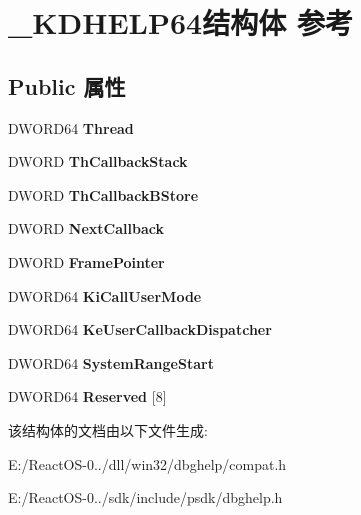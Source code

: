\hypertarget{struct___k_d_h_e_l_p64}{}\section{\+\_\+\+K\+D\+H\+E\+L\+P64结构体 参考}
\label{struct___k_d_h_e_l_p64}
\subsection*{Public 属性}
\begin{DoxyCompactItemize}
\item 
\mbox{\label{struct___k_d_h_e_l_p64_ad54883742842530e7313e9232ab58693}} 
D\+W\+O\+R\+D64 {\bfseries Thread}
\item 
\mbox{\label{struct___k_d_h_e_l_p64_a2960c0312baa12750404454f5a550930}} 
D\+W\+O\+RD {\bfseries Th\+Callback\+Stack}
\item 
\mbox{\label{struct___k_d_h_e_l_p64_a2627f807de1ce437da69006f3f827e11}} 
D\+W\+O\+RD {\bfseries Th\+Callback\+B\+Store}
\item 
\mbox{\label{struct___k_d_h_e_l_p64_a9bcc8fa46446b19a8aa5a03d6085baa9}} 
D\+W\+O\+RD {\bfseries Next\+Callback}
\item 
\mbox{\label{struct___k_d_h_e_l_p64_a9788c04d5d3fb25ba8b38542fd2f667b}} 
D\+W\+O\+RD {\bfseries Frame\+Pointer}
\item 
\mbox{\label{struct___k_d_h_e_l_p64_a7844c9d3f429c7b4c292083ae27a8beb}} 
D\+W\+O\+R\+D64 {\bfseries Ki\+Call\+User\+Mode}
\item 
\mbox{\label{struct___k_d_h_e_l_p64_a9dd85a34d6bc9900f6f46a95fef1d6a9}} 
D\+W\+O\+R\+D64 {\bfseries Ke\+User\+Callback\+Dispatcher}
\item 
\mbox{\label{struct___k_d_h_e_l_p64_a631c21491404182176adfecb74acd939}} 
D\+W\+O\+R\+D64 {\bfseries System\+Range\+Start}
\item 
\mbox{\label{struct___k_d_h_e_l_p64_af706dcae8e5438f7793ac8e0b7fe02a0}} 
D\+W\+O\+R\+D64 {\bfseries Reserved} \mbox{[}8\mbox{]}
\end{DoxyCompactItemize}


该结构体的文档由以下文件生成\+:\begin{DoxyCompactItemize}
\item 
E\+:/\+React\+O\+S-\/0../dll/win32/dbghelp/compat.\+h\item 
E\+:/\+React\+O\+S-\/0../sdk/include/psdk/dbghelp.\+h\end{DoxyCompactItemize}

